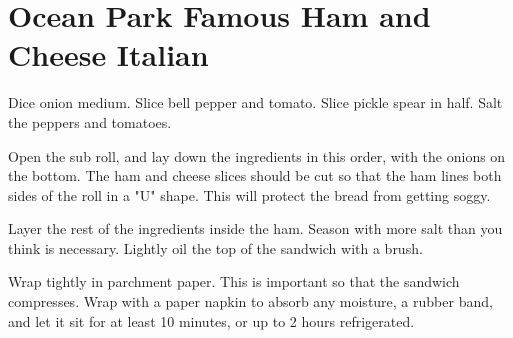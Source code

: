 \section{Ocean Park Famous Ham and Cheese Italian}
\begin{recipe}



Dice onion medium. Slice bell pepper and tomato. 
Slice pickle spear in half. Salt the peppers and tomatoes. 


Open the sub roll, and lay down the ingredients in this order, with the onions on the bottom.
The ham and cheese slices should be cut so that the ham lines both sides of the roll in a "U" shape.
This will protect the bread from getting soggy.

Layer the rest of the ingredients inside the ham. Season with more salt than you think is necessary. 
Lightly oil the top of the sandwich with a brush. 

Wrap tightly in parchment paper. This is important so that the sandwich compresses. Wrap with a paper napkin to absorb any moisture, a rubber
band, and let it sit for at least 10 minutes, or up to 2 hours refrigerated. 

\end{recipe}

